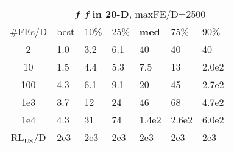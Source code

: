 \begin{tabular}{c|llllll}
 & \multicolumn{6}{|c}{\textbf{\textit{f}\raisebox{-0.35ex}{1}--\textit{f}\raisebox{-0.35ex}{24} in 20-D}, maxFE/D=2500}\\
\#FEs/D & best & 10\% & 25\% & \textbf{med} & 75\% & 90\%\\
2 & \hspace*{1ex}1.0 & \hspace*{1ex}3.2 & \hspace*{1ex}6.1 & 40 & 40 & 40\\
10 & \hspace*{1ex}1.5 & \hspace*{1ex}4.4 & \hspace*{1ex}5.3 & \hspace*{1ex}7.5 & 13 & 2.0e2\\
100 & \hspace*{1ex}4.3 & \hspace*{1ex}6.1 & \hspace*{1ex}9.1 & 20 & 45 & 2.7e2\\
1e3 & \hspace*{1ex}3.7 & 12 & 24 & 46 & 68 & 4.7e2\\
1e4 & \hspace*{1ex}4.3 & 31 & 74 & 1.4e2 & 2.6e2 & 6.0e2\\
$\text{RL}_{\text{US}}$/D & 2e3 & 2e3 & 2e3 & 2e3 & 2e3 & 2e3
\end{tabular}
